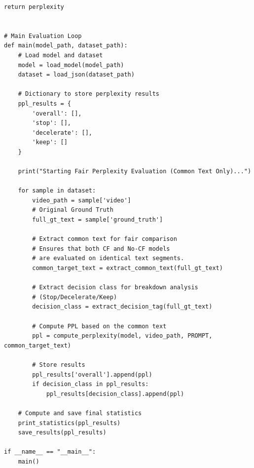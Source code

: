 \documentclass{article}
\begin{document}
\begin{lstlisting}[label={lst:perplexity}]
    return perplexity


# Main Evaluation Loop
def main(model_path, dataset_path):
    # Load model and dataset
    model = load_model(model_path)
    dataset = load_json(dataset_path)
    
    # Dictionary to store perplexity results
    ppl_results = {
        'overall': [],
        'stop': [],
        'decelerate': [],
        'keep': []
    }

    print("Starting Fair Perplexity Evaluation (Common Text Only)...")

    for sample in dataset:
        video_path = sample['video']
        # Original Ground Truth
        full_gt_text = sample['ground_truth']
        
        # Extract common text for fair comparison
        # Ensures that both CF and No-CF models 
        # are evaluated on identical text segments.
        common_target_text = extract_common_text(full_gt_text)
        
        # Extract decision class for breakdown analysis 
        # (Stop/Decelerate/Keep)
        decision_class = extract_decision_tag(full_gt_text)

        # Compute PPL based on the common text
        ppl = compute_perplexity(model, video_path, PROMPT, common_target_text)
        
        # Store results
        ppl_results['overall'].append(ppl)
        if decision_class in ppl_results:
            ppl_results[decision_class].append(ppl)

    # Compute and save final statistics
    print_statistics(ppl_results)
    save_results(ppl_results)

if __name__ == "__main__":
    main()
\end{lstlisting}



\end{document}
